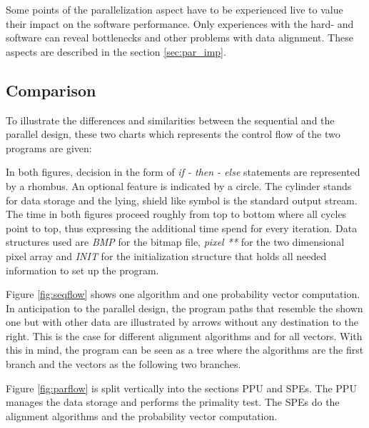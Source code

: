 Some points of the parallelization aspect have to be experienced live to value their impact on the software performance. Only experiences with the hard- and software can reveal bottlenecks and other problems with data alignment. These aspects are described in the section \ref{sec:par_imp}.

\subsection{Comparison}
\label{sec:designcomp}

To illustrate the differences and similarities between the sequential and the parallel design, these two charts which represents the control flow of the two programs are given:

\begin{figure}[H]
\begin{minipage}[t]{0.475\textwidth}
\centering
\end{minipage}
\hfill
\begin{minipage}[t]{0.475\textwidth}
\centering
\end{minipage}
\end{figure}

In both figures, decision in the form of \emph{if - then - else} statements are represented by a rhombus. An optional feature is indicated by a circle. The cylinder stands for data storage and the lying, shield like symbol is the standard output stream. The time in both figures proceed roughly from top to bottom where all cycles point to top, thus expressing the additional time spend for every iteration. Data structures used are \emph{BMP}  for the bitmap file, \emph{pixel **} for the two dimensional pixel array and \emph{INIT} for the initialization structure that holds all needed information to set up the program.

Figure \ref{fig:seqflow} shows one algorithm and one probability vector computation. In anticipation to the parallel design, the program paths that resemble the shown one but with other data are illustrated by arrows without any destination to the right. This is the case for different alignment algorithms and for all vectors. With this in mind, the program can be seen as a tree where the algorithms are the first branch and the vectors as the following two branches.

Figure \ref{fig:parflow} is split vertically into the sections PPU and SPEs. The PPU manages the data storage and performs the primality test. The SPEs do the alignment algorithms and the probability vector computation.

